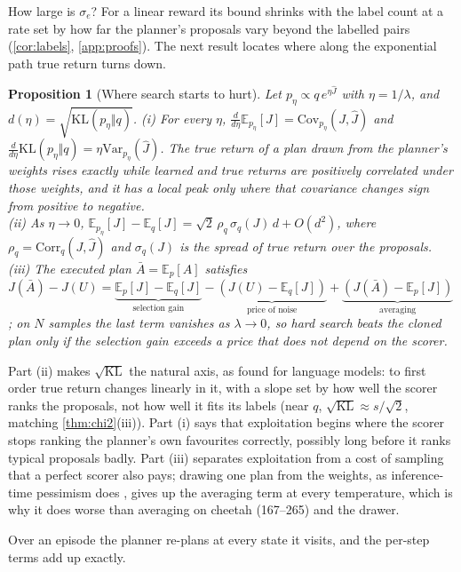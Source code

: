 \documentclass{article}
\theoremstyle{plain}
\newtheorem{proposition}[theorem]{Proposition}
\theoremstyle{remark}
\newcommand{\E}{\mathbb{E}}
\newcommand{\KL}{\mathrm{KL}}
\newcommand{\Jh}{\hat{J}}
\newcommand{\Cov}{\mathrm{Cov}}
\newcommand{\Var}{\mathrm{Var}}
\begin{document}
How large is $\sigma_e$? For a linear reward its bound shrinks with the label count at a rate set by how far the planner's
proposals vary beyond the labelled pairs (\cref{cor:labels}, \cref{app:proofs}). The next result locates where along the exponential path true return turns down.

\begin{proposition}[Where search starts to hurt]\label{prop:onset}
Let $p_\eta\propto q\,e^{\eta\Jh}$ with $\eta=1/\lambda$, and $d(\eta)=\sqrt{\KL(p_\eta\Vert q)}$.
(i) For every $\eta$, $\tfrac{d}{d\eta}\E_{p_\eta}[J]=\Cov_{p_\eta}(J,\Jh)$ and
$\tfrac{d}{d\eta}\KL(p_\eta\Vert q)=\eta\Var_{p_\eta}(\Jh)$. The true return of a plan drawn from the planner's
weights rises exactly while learned and true returns are positively correlated under those weights, and it has a
local peak only where that covariance changes sign from positive to negative.
\\[2pt](ii) As $\eta\to0$, $\E_{p_\eta}[J]-\E_q[J]=\sqrt2\,\rho_q\,\sigma_q(J)\,d+O(d^2)$, where
$\rho_q=\mathrm{Corr}_q(J,\Jh)$ and $\sigma_q(J)$ is the spread of true return over the proposals.
\\[2pt](iii) The executed plan $\bar A=\E_{p}[A]$ satisfies
$J(\bar A)-J(U)=\underbrace{\E_p[J]-\E_q[J]}_{\text{selection gain}}-\underbrace{(J(U)-\E_q[J])}_{\text{price of
noise}}+\underbrace{(J(\bar A)-\E_p[J])}_{\text{averaging}}$; on $N$ samples the last term vanishes as
$\lambda\to0$, so hard search beats the cloned plan only if the selection gain exceeds a price that does not
depend on the scorer.
\end{proposition}

Part (ii) makes $\sqrt{\KL}$ the natural axis, as \citet{gao2023scaling} found for language models: to first order
true return changes linearly in it, with a slope set by how well the scorer ranks the proposals, not how well it fits
its labels (near $q$, $\sqrt{\KL}\approx s/\sqrt2$, matching \cref{thm:chi2}(iii)). Part (i) says
that exploitation begins where the scorer stops ranking the planner's own favourites correctly, possibly long before
it ranks typical proposals badly. Part (iii) separates exploitation from a cost of sampling that a perfect scorer also
pays; drawing one plan from the weights, as inference-time pessimism does \citep{huang2025bestofn}, gives up the
averaging term at every temperature, which is why it does worse than averaging on cheetah (167--265) and the drawer.

Over an episode the planner re-plans at every state it visits, and the per-step terms add up exactly.
\end{document}
